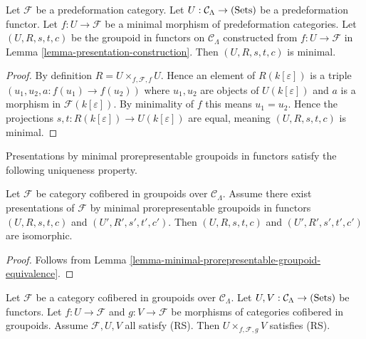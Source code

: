 \begin{lemma}
\label{lemma-minimal-groupoid-in-functors-construction}
Let $\mathcal F$ be a predeformation category.  Let $U: \mathcal C_{\Lambda} 
\rightarrow \textnormal{(Sets)}$ be a predeformation functor.  Let $f: U 
\rightarrow \mathcal F$ be a minimal morphism of predeformation categories. Let 
$(U,R,s,t,c)$ be the groupoid in functors on $\mathcal C_{\Lambda}$ constructed 
from $f: U \rightarrow \mathcal F$ in Lemma 
\ref{lemma-presentation-construction}.  Then $(U,R,s,t,c)$ is minimal. 
\end{lemma}

\begin{proof}
By definition $R = U \times_{f,\mathcal F, f} U$.  Hence an element of 
$R(k[\varepsilon])$ is a triple $(u_1, u_2, a: f(u_1) \rightarrow f(u_2))$ 
where $u_1,u_2$ are objects of $U(k[\varepsilon])$ and $a$ is a morphism in 
$\mathcal F(k[\varepsilon])$.  By minimality of $f$ this means $u_1 = u_2$.  
Hence the projections $s,t: R(k[\varepsilon]) \rightarrow U(k[\varepsilon])$ 
are equal, meaning  $(U,R,s,t,c)$ is minimal.
\end{proof}

\noindent
Presentations by minimal prorepresentable groupoids in functors satisfy the 
following uniqueness property.

\begin{lemma}
\label{lemma-minimal-presentations-equivalent}
Let $\mathcal F$ be category cofibered in groupoids over $\mathcal 
C_{\Lambda}$. Assume there exist presentations of $\mathcal F$ by minimal 
prorepresentable groupoids in functors $(U,R,s,t,c)$ and $(U',R',s',t',c')$. 
Then $(U,R,s,t,c)$ and $(U',R',s',t',c')$ are isomorphic.
\end{lemma}

\begin{proof}
Follows from Lemma \ref{lemma-minimal-prorepresentable-groupoid-equivalence}.
\end{proof}

\begin{lemma}
\label{lemma-RS-fiber-product-morphisms}
Let $\mathcal F$ be a category cofibered in groupoids over $\mathcal 
C_{\Lambda}$.  Let $U,V: \mathcal C_{\Lambda} \rightarrow \textnormal{(Sets)}$ 
be functors.  Let $f: U \rightarrow \mathcal F$ and $g: V \rightarrow \mathcal 
F$ be morphisms of categories cofibered in groupoids.  Assume $\mathcal F, U, 
V$ all satisfy (RS).  Then $U \times_{f, \mathcal F, g} V$ satisfies (RS).
\end{lemma}


